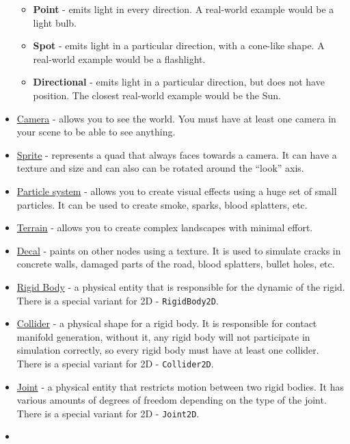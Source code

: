 \documentclass[
]{book}
\providecommand{\tightlist}{%
  \setlength{\itemsep}{0pt}\setlength{\parskip}{0pt}}
\theoremstyle{definition}
\theoremstyle{definition}
\theoremstyle{definition}
\theoremstyle{definition}
\theoremstyle{remark}
\begin{document}
\begin{itemize}
  \begin{itemize}
  \tightlist
  \item
    \textbf{Point} - emits light in every direction. A real-world example would be a light bulb.
  \item
    \textbf{Spot} - emits light in a particular direction, with a cone-like shape. A real-world example would be a flashlight.
  \item
    \textbf{Directional} - emits light in a particular direction, but does not have position. The closest real-world example would be the Sun.
  \end{itemize}
\item
  \href{../scene/camera_node.md}{Camera} - allows you to see the world. You must have at least one camera in your scene to be able to see anything.
\item
  \href{../scene/sprite_node.md}{Sprite} - represents a quad that always faces towards a camera. It can have a texture and size and can also can be rotated around the ``look'' axis.
\item
  \href{../scene/particle_system_node.md}{Particle system} - allows you to create visual effects using a huge set of small particles. It can be used to create smoke, sparks, blood splatters, etc.
\item
  \href{../scene/terrain_node.md}{Terrain} - allows you to create complex landscapes with minimal effort.
\item
  \href{../scene/decal_node.md}{Decal} - paints on other nodes using a texture. It is used to simulate cracks in concrete walls, damaged parts of the road, blood splatters, bullet holes, etc.
\item
  \href{../physics/rigid_body.md}{Rigid Body} - a physical entity that is responsible for the dynamic of the rigid. There is a special variant for 2D - \texttt{RigidBody2D}.
\item
  \href{../physics/collider.md}{Collider} - a physical shape for a rigid body. It is responsible for contact manifold generation, without it, any rigid body will not participate in simulation correctly, so every rigid body must have at least one collider. There is a special variant for 2D - \texttt{Collider2D}.
\item
  \href{../physics/joint.md}{Joint} - a physical entity that restricts motion between two rigid bodies. It has various amounts of degrees of freedom depending on the type of the joint. There is a special variant for 2D - \texttt{Joint2D}.
\item

\end{itemize}
\end{document}

